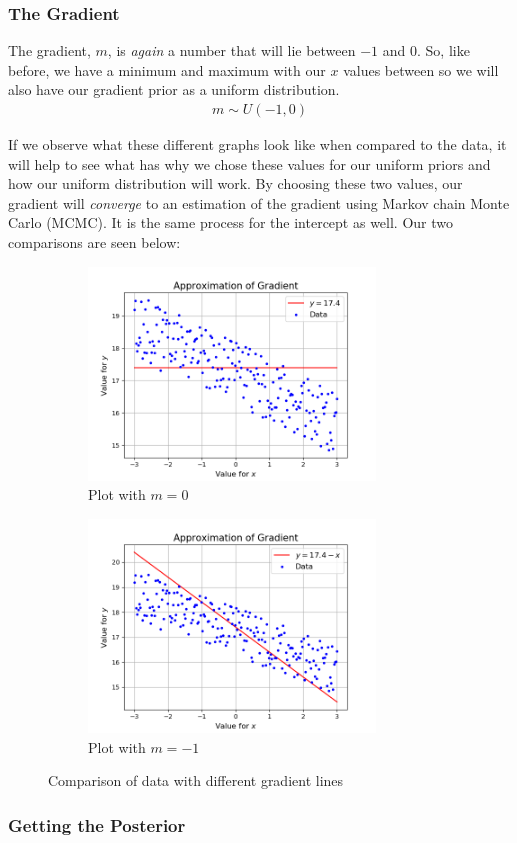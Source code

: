 \documentclass[11pt]{article}   %
\begin{document}
\subsubsection{The Gradient}\label{The Gradient}

The gradient, $m$, is \textit{again} a number that will lie between $-1$ and $0$. So, like before, we have a minimum and maximum with our $x$ values between so we will also have our gradient prior as a uniform distribution.
\begin{align*}
m \sim U(-1, 0)
\end{align*}

If we observe what these different graphs look like when compared to the data, it will help to see what has why we chose these values for our uniform priors and how our uniform distribution will work. By choosing these two values, our gradient will \textit{converge} to an estimation of the gradient using Markov chain Monte Carlo (MCMC). It is the same process for the intercept as well. Our two comparisons are seen below:
\begin{figure}[H]
\centering
\begin{subfigure}{0.5\linewidth}
  \centering
  \includegraphics[width = 3in]{gradient0.png}
  \caption{Plot with $m = 0$}
  \label{fig:sub1}
\end{subfigure}%
\begin{subfigure}{0.5\linewidth}
  \centering
  \includegraphics[width = 3in]{gradient1.png}
  \caption{Plot with $m = -1$}
  \label{fig:sub2}
\end{subfigure}
\caption{Comparison of data with different gradient lines}
\label{fig:gradient}
\end{figure}

\subsubsection{Getting the Posterior}\label{Getting the Posterior2}
\end{document}
